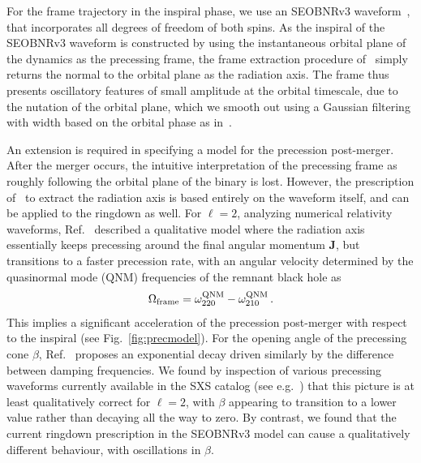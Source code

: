 \documentclass[aps,showpacs,twocolumn,
prd,superscriptaddress,nofootinbib]{revtex4-1}
\newcommand{\be}{\begin{equation}}
\newcommand{\ee}{\end{equation}}
\begin{document}
For the frame trajectory in the inspiral phase, we use an SEOBNRv3 waveform~\cite{Pan+13, BTB16}, that incorporates all degrees of freedom of both spins. As the inspiral of the SEOBNRv3 waveform is constructed by using the instantaneous orbital plane of the dynamics as the precessing frame, the frame extraction procedure of~\cite{OShaughnessy+11} simply returns the normal to the orbital plane as the radiation axis. The frame thus presents oscillatory features of small amplitude at the orbital timescale, due to the nutation of the orbital plane, which we smooth out using a Gaussian filtering with width based on the orbital phase as in~\cite{Blackman+17a}.

An extension is required in specifying a model for the precession post-merger. After the merger occurs, the intuitive interpretation of the precessing frame as roughly following the orbital plane of the binary is lost. However, the prescription of~\cite{OShaughnessy+11} to extract the radiation axis is based entirely on the waveform itself, and can be applied to the ringdown as well. For $\ell=2$, analyzing numerical relativity waveforms, Ref.~\cite{OShaughnessy+12} described a qualitative model where the radiation axis essentially keeps precessing around the final angular momentum $\bm{J}$, but transitions to a faster precession rate, with an angular velocity determined by the quasinormal mode (QNM) frequencies of the remnant black hole as
\be\label{eq:OmegaframeQNM}
	\Omega_{\rm frame} = \omega_{220}^{\rm QNM} - \omega_{210}^{\rm QNM} \,.
\ee
This implies a significant acceleration of the precession post-merger with respect to the inspiral (see Fig.~\ref{fig:precmodel}). For the opening angle of the precessing cone $\beta$, Ref.~\cite{OShaughnessy+12} proposes an exponential decay driven similarly by the difference between damping frequencies. We found by inspection of various precessing waveforms currently available in the SXS catalog (see e.g.~\cite{SXScatalog, Mroue+12, Mroue+13}) that this picture is at least qualitatively correct for $\ell=2$, with $\beta$ appearing to transition to a lower value rather than decaying all the way to zero. By contrast, we found that the current ringdown prescription in the SEOBNRv3 model can cause a qualitatively different behaviour, with oscillations in $\beta$.
\end{document}
